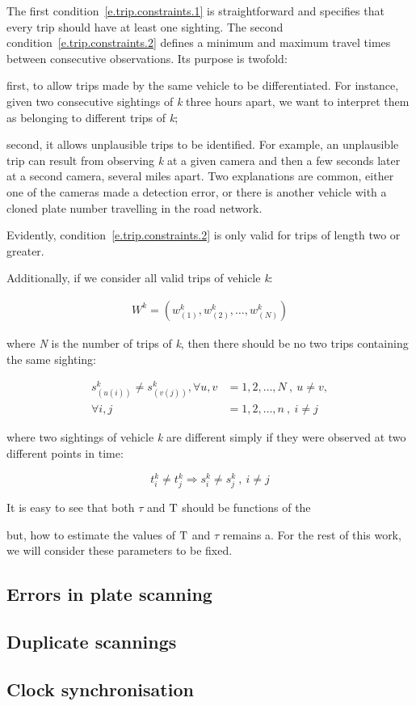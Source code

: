 The first condition~\ref{e.trip.constraints.1} is straightforward and specifies that every trip should have at least one sighting. The second condition~\ref{e.trip.constraints.2} defines a minimum and maximum travel times between consecutive observations. Its purpose is twofold:
\begin{enumerate*}[label=(\roman*)]
  \item first, to allow trips made by the same vehicle to be differentiated. For instance, given two consecutive sightings of \emph{k} three hours apart, we want to interpret them as belonging to different trips of \emph{k};
  \item second, it allows unplausible trips to be identified. For example, an unplausible trip can result from observing \emph{k} at a given camera and then a few seconds later at a second camera, several miles apart. Two explanations are common, either one of the cameras made a detection error, or there is another vehicle with a cloned plate number travelling in the road network.
\end{enumerate*} Evidently, condition~\ref{e.trip.constraints.2} is only valid for trips of length two or greater.

Additionally, if we consider all valid trips of vehicle \emph{k}:

\begin{align}
W^{k} = \left( w^{k}_{(1)}, w^{k}_{(2)}, \ldots, w^{k}_{(N)} \right) \label{e.trip.history}
\end{align}

where \emph{N} is the number of trips of \emph{k}, then there should be no two trips containing the same sighting:

\begin{align}
s^{k}_{(u(i))} \neq s^{k}_{(v(j))}, \forall u,v &= 1, 2, \ldots, N \ , \ u \neq v,  \label{e.trip.history.constraint} \\
\forall i,j &= 1, 2, \ldots, n \ , \ i \neq j \nonumber
\end{align}

where two sightings of vehicle \emph{k} are different simply if they were observed at two different points in time:

\begin{equation} \label{e.sighting.different}
t^{k}_{i} \ne t^{k}_{j} \Rightarrow s^{k}_{i} \ne s^{k}_{j} \ , \ i \ne j
\end{equation}

It is easy to see that both $\tau$ and $\mathrm{T}$ should be functions of the

but, how to estimate the values of $\mathrm{T}$ and $\tau$ remains a. For the rest of this work, we will consider these parameters to be fixed.

\subsection{Errors in plate scanning}


\subsection{Duplicate scannings}

\subsection{Clock synchronisation}
